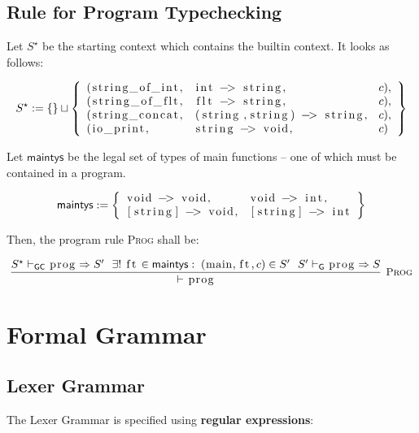 \documentclass{article}
\newcommand{\code}[1]{\lstinline[columns=fixed]{#1}}
\newcommand{\drmrule}[5]{\frac{#1}{#2\vdash_{\mathsf{#3}}#4}\textsc{\ \small{#5}}}
\newcommand{\ruleapp}[1]{\vdash_{\mathsf{#1}}}
\newcommand{\mc}[1]{\textnormal{\code{#1}}}
\begin{document}
		\subsection{Rule for Program Typechecking}
		
			Let $S^\star$ be the starting context which contains the builtin context. It looks as follows:
			
			\begin{align*}
				S^\star := \{\}\sqcup \left\{
					\begin{array}{lll}
						(\mc{string\_of\_int},&\mc{int -> string},&c),\\ (\mc{string\_of\_flt},&\mc{flt -> string},&c),\\
						(\mc{string\_concat},&\mc{(string,string) -> string},&c),\\
						(\mc{io\_print},&\mc{string -> void},&c)
					\end{array}
				\right\}
			\end{align*}
			
			Let $\mathsf{maintys}$ be the legal set of types of main functions -- one of which must be contained in a program.
			
			\begin{align*}
				\mathsf{maintys} := \left\{
					\begin{array}{ll}
						\mc{void -> void}, & \mc{void -> int},\\
						\mc{[string] -> void}, & \mc{[string] -> int}
					\end{array}
				\right\}
			\end{align*}
		
			Then, the program rule \textsc{Prog} shall be:
		
			\begin{align*}
				\drmrule{S^\star \ruleapp{GC} \mc{prog} \Rightarrow S' \ \ \exists!\; \mc{ft}\in\mathsf{maintys}:\;(\mc{main},\mc{ft},c)\in S'\ \ S' \ruleapp{G} \mc{prog} \Rightarrow S}{}{}{\mc{prog}}{Prog}
			\end{align*}
		
	\section{Formal Grammar}
	
		\subsection{Lexer Grammar}
		
			The Lexer Grammar is specified using \textbf{regular expressions}:
			
\end{document}
